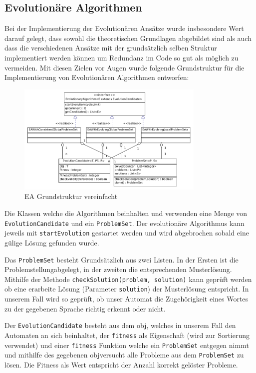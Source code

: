 \subsection{Evolutionäre Algorithmen}
Bei der Implementierung der Evolutionären Ansätze wurde insbesondere Wert darauf gelegt, dass sowohl die theoretischen Grundlagen abgebildet sind als auch dass die verschiedenen Ansätze mit der grundsätzlich selben Struktur implementiert werden können um Redundanz im Code so gut als möglich zu vermeiden. Mit diesen Zielen vor Augen wurde folgende Grundstruktur für die Implementierung von Evolutionären Algorithmen entworfen:

\begin{figure}[h]
  \centering
  \includegraphics[width=0.8\textwidth]{images/simple_uml_evolution.pdf}
  \caption[EA Grundstruktur Klassendiagramm]{EA Grundstruktur vereinfacht}
  \label{fig:ea_classdiag_simple}
\end{figure}

Die Klassen welche die Algorithmen beinhalten und verwenden eine Menge von \lstinline$EvolutionCandidate$ und ein \lstinline$ProblemSet$. Der evolutionäre Algorithmus kann jeweils mit \lstinline$startEvolution$ gestartet werden und wird abgebrochen sobald eine gülige Lösung gefunden wurde.

Das \lstinline$ProblemSet$ besteht Grundsätzlich aus zwei Listen. In der Ersten ist die \flqq Problemstellung\frqq abgelegt, in der zweiten die entsprechenden Musterlösung. Mithilfe der Methode \lstinline$checkSolution(problem, solution)$ kann geprüft werden ob eine erarbeite Lösung (Parameter \lstinline$solution$) der Musterlösung entspricht. In unserem Fall wird so geprüft, ob unser Automat die Zugehörigkeit eines Wortes zu der gegebenen Sprache richtig erkennt oder nicht.

Der \lstinline$EvolutionCandidate$ besteht aus dem \flqq obj\frqq, welches in unserem Fall den Automaten an sich beinhaltet, der \lstinline$fitness$ als Eigenschaft (wird zur Sortierung verwendet) und einer \lstinline$fitness$ Funktion welche ein \lstinline$ProblemSet$ entgegen nimmt und mithilfe des gegebenen \flqq obj\frqq versucht alle Probleme aus dem \lstinline$ProblemSet$ zu lösen. Die Fitness als Wert entspricht der Anzahl korrekt gelöster Probleme.

